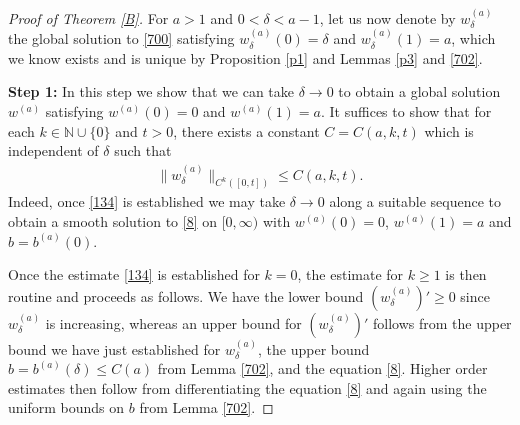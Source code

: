 \documentclass[12pt]{article}
\numberwithin{equation}{section}
\theoremstyle{plain}
\theoremstyle{definition}
\begin{document}
\begin{proof}[Proof of Theorem \ref{B}]
For $a>1$ and $0<\delta<a-1$, let us now denote by $w_\delta^{(a)}$ the global solution to \eqref{700} satisfying $w_\delta^{(a)}(0) = \delta$ and $w_\delta^{(a)}(1)=a$, which we know exists and is unique by Proposition \ref{p1} and Lemmas \ref{p3} and \ref{702}.\medskip 

\noindent\textbf{Step 1:} In this step we show that we can take $\delta\rightarrow 0$ to obtain a global solution $w^{(a)}$ satisfying $w^{(a)}(0)=0$ and $w^{(a)}(1) = a$. It suffices to show that for each $k\in\mathbb{N}\cup\{0\}$ and $t>0$, there exists a constant $C=C(a,k,t)$ which is independent of $\delta$ such that
	\begin{align}\label{134}
	\|w_\delta^{(a)}\|_{C^k([0,t])} \leq C(a,k,t).
	\end{align}
	Indeed, once \eqref{134} is established we may take $\delta\rightarrow 0$ along a suitable sequence to obtain a smooth solution to \eqref{8} on $[0,\infty)$ with $w^{(a)}(0)=0$, $w^{(a)}(1) = a$ and $b = b^{(a)}(0)$.\medskip
	
	Once the estimate \eqref{134} is established for $k=0$, the estimate for $k\geq 1$ is then routine and proceeds as follows. We have the lower bound $(w^{(a)}_\delta)'\geq 0$ since $w^{(a)}_\delta$ is increasing, whereas an upper bound for $(w_\delta^{(a)})'$ follows from the upper bound we have just established for $w_\delta^{(a)}$, the upper bound $b=b^{(a)}(\delta) \leq C(a)$ from Lemma \ref{702}, and the equation \eqref{8}. Higher order estimates then follow from differentiating the equation \eqref{8} and again using the uniform bounds on $b$ from Lemma \ref{702}. \medskip
	

\end{proof}
\end{document}
